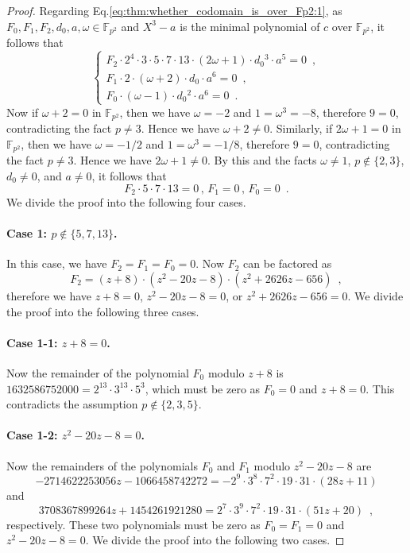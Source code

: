 \documentclass{article}
\theoremstyle{definition}
\newcommand{\FF}{\mathbb{F}}
\begin{document}
\begin{proof}
Regarding Eq.\eqref{eq:thm:whether_codomain_is_over_Fp2:1}, as $F_0,F_1,F_2,d_0,a,\omega \in \FF_{p^2}$ and $X^3 - a$ is the minimal polynomial of $c$ over $\FF_{p^2}$, it follows that
\[
\begin{cases}
F_2 \cdot 2^4 \cdot 3 \cdot 5 \cdot 7 \cdot 13 \cdot (2 \omega + 1) \cdot d_0{}^3 \cdot a^5 = 0 \enspace,\\
F_1 \cdot 2 \cdot (\omega + 2) \cdot d_0 \cdot a^6 = 0 \enspace,\\
F_0 \cdot (\omega - 1) \cdot d_0{}^2 \cdot a^6 = 0 \enspace.
\end{cases}
\]
Now if $\omega + 2 = 0$ in $\FF_{p^2}$, then we have $\omega = -2$ and $1 = \omega^3 = -8$, therefore $9 = 0$, contradicting the fact $p \neq 3$.
Hence we have $\omega + 2 \neq 0$.
Similarly, if $2 \omega + 1 = 0$ in $\FF_{p^2}$, then we have $\omega = -1/2$ and $1 = \omega^3 = -1/8$, therefore $9 = 0$, contradicting the fact $p \neq 3$.
Hence we have $2 \omega + 1 \neq 0$.
By this and the facts $\omega \neq 1$, $p \not\in \{2,3\}$, $d_0 \neq 0$, and $a \neq 0$, it follows that
\[
F_2 \cdot 5 \cdot 7 \cdot 13 = 0 \,,\,
F_1 = 0 \,,\,
F_0 = 0 \enspace.
\]
We divide the proof into the following four cases.

\paragraph{Case 1: $p \not\in \{5,7,13\}$.}

In this case, we have $F_2 = F_1 = F_0 = 0$.
Now $F_2$ can be factored as
\[
F_2 = (z + 8) \cdot (z^2 - 20 z - 8) \cdot (z^2 + 2626 z - 656) \enspace,
\]
therefore we have $z + 8 = 0$, $z^2 - 20 z - 8 = 0$, or $z^2 + 2626 z - 656 = 0$.
We divide the proof into the following three cases.

\paragraph{Case 1-1: $z + 8 = 0$.}

Now the remainder of the polynomial $F_0$ modulo $z + 8$ is $1632586752000 = 2^{13} \cdot 3^{13} \cdot 5^3$, which must be zero as $F_0 = 0$ and $z + 8 = 0$.
This contradicts the assumption $p \not\in \{2,3,5\}$.

\paragraph{Case 1-2: $z^2 - 20 z - 8 = 0$.}

Now the remainders of the polynomials $F_0$ and $F_1$ modulo $z^2 - 20 z - 8$ are
\[
-2714622253056 z - 1066458742272
= -2^9 \cdot 3^8 \cdot 7^2 \cdot 19 \cdot 31 \cdot (28 z + 11)
\]
and
\[
3708367899264 z + 1454261921280
= 2^7 \cdot 3^9 \cdot 7^2 \cdot 19 \cdot 31 \cdot (51 z + 20) \enspace,
\]
respectively.
These two polynomials must be zero as $F_0 = F_1 = 0$ and $z^2 - 20 z - 8 = 0$.
We divide the proof into the following two cases.


\end{proof}
\end{document}
